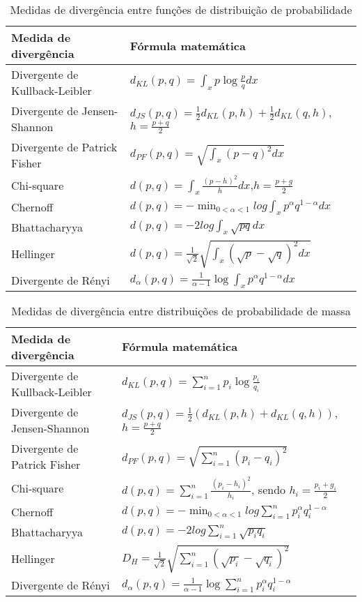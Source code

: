 \begin{table}
\centering
\caption{\label{tbl:cont_div}Medidas de divergência entre funções de distribuição de probabilidade}
\begin{tabular}[]{ll}
\hline
Medida de divergência&Fórmula matemática\\
\hline
Divergente de Kullback-Leibler&$d_{KL}(p,q) = \int_{x} p\log{\frac{p}{q}}dx$\\
Divergente de Jensen-Shannon&$d_{JS}(p,q) =\frac{1}{2}d_{KL}(p,h)+\frac{1}{2}d_{KL}(q,h)$, $h = \frac{p+q}{2}$\\
Divergente de Patrick Fisher&$d_{PF}(p,q) = \sqrt{\int_{x}{(p-q)}^2dx}$\\
Chi-square&$d(p,q)= \int_{x}{\frac{(p-h)^2}{h}dx}$,$h = \frac{p + g}{2}$\\
Chernoff&$\displaystyle d(p,q) = - \min_{0<\alpha<1}{log{\int_{x}{p^{\alpha}q^{1-\alpha}}dx}}$\\
Bhattacharyya&$d(p,q) = -2log{\int_{x}{\sqrt{pq}dx}}$\\
Hellinger&$d(p,q)=\frac{1}{\sqrt{2}}\sqrt{\int_{x}{(\sqrt{p}-\sqrt{q})^2dx}}$\\
Divergente de Rényi&$d_{\alpha}(p,q) =\frac{1}{\alpha-1}\log{\int_{x}{p^{\alpha}q^{1-\alpha}}dx}$\\
\hline
\end{tabular}
\end{table}


\begin{table}
\centering
\caption{\label{tbl:divergence}Medidas de divergência entre distribuições de probabilidade de massa}
\begin{tabular}[]{ll}
\hline
Medida de divergência&Fórmula matemática\\
\hline
Divergente de Kullback-Leibler&$d_{KL}(p,q) = \sum\limits_{i = 1}^{n} p_{i}\log{\frac{p_{i}}{q_{i}}}$\\
Divergente de Jensen-Shannon&$d_{JS}(p,q) =\frac{1}{2}(d_{KL}(p,h)+d_{KL}(q,h))$, $h = \frac{p+q}{2}$\\
Divergente de Patrick Fisher&$d_{PF}(p,q) = \sqrt{\sum\limits_{i=1}^{n}{(p_i-q_i)}^2}$\\
Chi-square&$d(p,q)= \sum\limits_{i = 1}^{n}{\frac{(p_{i}-h_{i})^2}{h_{i}}}$, sendo $h_{i} = \frac{p_{i} + g_{i}}{2}$\\
Chernoff&$\displaystyle d(p,q) = - \min_{0<\alpha<1}{log{\sum\limits_{i=1}^{n}{p_i^{\alpha}q_i^{1-\alpha}}}}$\\
Bhattacharyya&$d(p,q) = -2log{\sum\limits_{i = 1}^{n}{\sqrt{p_{i}q_{i}}}}$\\
Hellinger&$D_{H}=\frac{1}{\sqrt{2}}\sqrt{\sum\limits_{i = 1}^{n}{(\sqrt{p_{i}}-\sqrt{q_{i}})^2}}$\\
Divergente de Rényi&$d_{\alpha}(p,q) =\frac{1}{\alpha-1}\log{\sum\limits_{i = 1}^{n}{p_i^{\alpha}q_i^{1-\alpha}}}$\\
\hline
\end{tabular}
\end{table}


